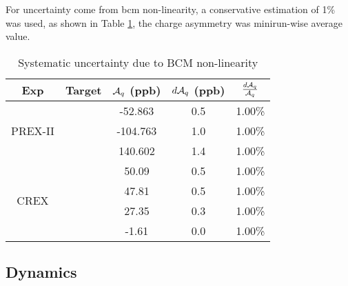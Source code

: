 For uncertainty come from bcm non-linearity, a conservative estimation of 1\% was used,
as shown in Table \ref{tab:AT_bcm_non-linearity}, the charge asymmetry was minirun-wise average 
value.
\begin{table}[!h]
    \centering
    \begin{tabular}{c c | c c c}
	\hline
	Exp & Target	& $\mathcal{A}_{q}$ (ppb) & $d\mathcal{A}_{q}$ (ppb)    & $\frac{d\mathcal{A}_{q}}{\mathcal{A}_{q}}$   \\
	\hline
	\multirow{3}{*}{PREX-II}
	    & \C    & -52.863   & 0.5   & 1.00\%    \\ 
	    & \ca   & -104.763  & 1.0   & 1.00\%    \\ 
	    & \Pb   & 140.602   & 1.4   & 1.00\%    \\ 
	\hline
	\multirow{4}{*}{CREX}
	    & \C    & 50.09	& 0.5   & 1.00\%    \\ 
	    & \ca   & 47.81	& 0.5   & 1.00\%    \\ 
	    & \Ca   & 27.35	& 0.3   & 1.00\%    \\ 
	    & \Pb   & -1.61	& 0.0   & 1.00\%    \\ 
	\hline
    \end{tabular}
    \caption{Systematic uncertainty due to BCM non-linearity}
    \label{tab:AT_bcm_non-linearity}
\end{table}

\subsection{Dynamics}

